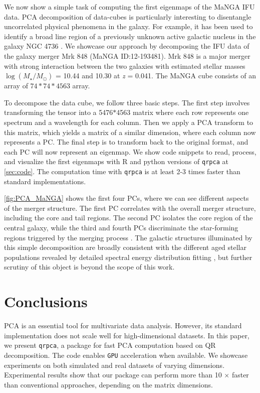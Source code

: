 \documentclass[preprint,authoryear,11pt,5p,times]{elsarticle}
\begin{document}
We now show a simple task of computing the first eigenmaps of the MaNGA IFU data.  PCA decomposition of data-cubes is particularly interesting to disentangle uncorrelated physical phenomena in the galaxy. For example, it has been used to identify a broad line region of a previously unknown active galactic nucleus in the galaxy  NGC 4736 \citep{Steiner2009}. We showcase our approach by decomposing the IFU data of  the galaxy merger Mrk 848 (MaNGA ID:12-193481). Mrk 848 is a major merger with strong interaction between the two galaxies with estimated stellar masses $\log(M_{\star}/M_{\odot})$ = 10.44 and 10.30 \citep{Yang2007} at \emph{z} = 0.041. The MaNGA cube consists of an array of $74*74*4563$ array.  





To decompose the data cube, we follow three basic steps. The first step involves transforming the tensor into a 5476$*$4563 matrix where each row represents one spectrum and a wavelength for each column. Then we apply a PCA transform to this matrix, which yields a matrix of a similar dimension, where each column now represents a PC. The final step is to transform back to the original format, and each PC will now represent an eigenmap. 
We show code snippets to read, process, and visualize the first eigenmaps with R and python versions of \texttt{qrpca} at \ref{sec:code}. The computation time with {\tt qrpca} is at least 2-3 times faster than standard implementations. 


\autoref{fig:PCA_MaNGA} shows the first four PCs, where we can see different aspects of the merger structure. The first PC correlates with the overall merger structure, including the core and tail regions. The second PC isolates the core region of the central galaxy, while the third and fourth PCs discriminate the star-forming regions triggered by the merging process \citep{Yuan2018}. The galactic structures illuminated by this simple decomposition are broadly consistent with the different aged stellar populations revealed by detailed spectral energy distribution fitting  \citep{Yuan2018}, but further scrutiny of this object is beyond the scope of this work. 






\section{Conclusions}
\label{sec:conclusion}
PCA is an essential tool for multivariate data analysis. However, its standard implementation does not scale well for high-dimensional datasets. In this paper, we present \texttt{qrpca}, a package for fast PCA computation based on QR decomposition. The code enables  {\tt GPU} acceleration when available. We showcase experiments on both simulated and real datasets of varying dimensions. Experimental results show that our package can perform more than 10 $\times$ faster than conventional approaches, depending on the matrix dimensions. 
\end{document}
